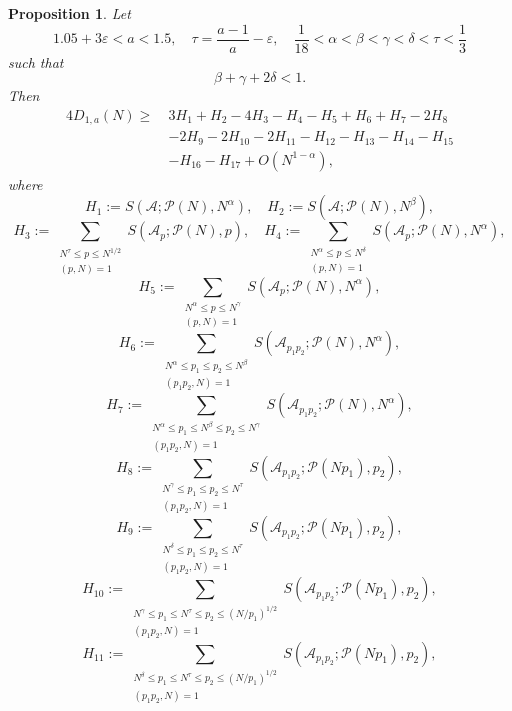 \documentclass[12pt, a4paper]{amsart}
\def\leq{\leqslant}
\def\geq{\geqslant}
\def\le{\leqslant}
\theoremstyle{plain}
\newtheorem{proposition}{Proposition}[section]
\theoremstyle{remark}
\numberwithin{equation}{section}
\begin{document}
\begin{proposition}\label{Goldbachweight2}
Let 
$$
1.05+3\varepsilon<a<1.5,\quad \tau=\dfrac{a-1}{a}-\varepsilon, \quad \dfrac{1}{18}<\alpha<\beta<\gamma<\delta< \tau<\dfrac{1}{3} 
$$ 
such that
\begin{equation}\label{Con/bcd}
\beta+\gamma+2\delta< 1. 
\end{equation}
Then 
\begin{equation}\label{Goldbachsmallw4}
		\begin{split}
		4D_{1,a}(N) \geq\ &3H_1 + H_2 -4H_3- H_4- H_5 + H_6 + H_7- 2H_8 \\
		& - 2H_9 -2H_{10}- 2H_{11} - H_{12} - H_{13}-H_{14}-H_{15} \\ 
		& -H_{16}-H_{17} + O(N^{1 - \alpha}),
		\end{split}
		\end{equation}
		where
\[
H_1 := S(\mathscr{A}; \mathscr{P}(N), N^{\alpha}),\quad H_2 := S(\mathscr{A}; \mathscr{P}(N), N^{\beta}),
\]
\[
H_3 :=\sum\limits_{\substack{N^\tau\le p\le N^{1/2} \\(p, N)=1}}S(\mathscr{A}_p ; \mathscr{P}(N), p),
\quad 
H_4 := \sum_{\substack{N^{\alpha} \leq p \le N^{\delta} \\ (p, N) = 1}} S(\mathscr{A}_p; \mathscr{P}(N), N^{\alpha}), 
\]
\[
H_5 := \sum_{\substack{N^{\alpha} \leq p \le N^{\gamma} \\ (p, N) = 1}} S(\mathscr{A}_p; \mathscr{P}(N), N^{\alpha}),
\]
\[ 
H_6 := \sum_{\substack{N^{\alpha} \leq p_1 \le p_2 \le N^{\beta} \\ (p_1 p_2, N) = 1}} S(\mathscr{A}_{p_1 p_2}; \mathscr{P}(N), N^{\alpha}),
\]
\[ 
H_7 := \sum_{\substack{N^{\alpha} \leq p_1 \le N^{\beta} \le p_2 \le N^{\gamma} \\ (p_1 p_2, N) = 1}} S(\mathscr{A}_{p_1 p_2}; \mathscr{P}(N), N^{\alpha}),
\] 
\[
H_8 := \sum_{\substack{N^{\gamma} \leq p_1 \le p_2 \le N^{\tau} \\ (p_1 p_2, N) = 1}} S(\mathscr{A}_{p_1 p_2}; \mathscr{P}(N p_1), p_2),
\]
\[ 
H_{9} := \sum_{\substack{N^{\delta} \leq p_1 \le p_2 \le N^{\tau} \\ (p_1 p_2, N) = 1}} S(\mathscr{A}_{p_1 p_2}; \mathscr{P}(N p_1), p_2),
\]
\[
H_{10} := \sum_{\substack{N^{\gamma} \leq p_1 \le N^{\tau}\le p_2 \le (N/p_1)^{1/2} \\ (p_1 p_2, N) = 1}} S(\mathscr{A}_{p_1 p_2}; \mathscr{P}(N p_1), p_2),
\]
\[
H_{11} := \sum_{\substack{N^{\delta} \leq p_1 \le N^{\tau}\le p_2 \le (N/p_1)^{1/2} \\ (p_1 p_2, N) = 1}} S(\mathscr{A}_{p_1 p_2}; \mathscr{P}(N p_1), p_2),
\]
\end{proposition}
\end{document}
